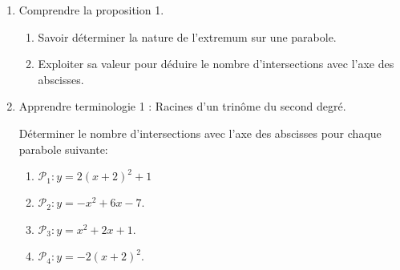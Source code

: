 \documentclass[a4paper,11pt]{article}
\theoremstyle{break}
\begin{document}
  \begin{Dev*}
    
    \begin{enumerate}
      
      \item Comprendre la proposition 1.
      \begin{enumerate}
	\item Savoir déterminer la nature de l'extremum sur une parabole.
	\item Exploiter sa valeur pour déduire le nombre d'intersections 
	avec l'axe des abscisses.
	
      \end{enumerate}
      \item Apprendre terminologie 1 : Racines d'un trinôme du second degré.
      \vspace{0.5cm}
      
      \begin{dm}
	
	Déterminer le nombre d'intersections avec l'axe des abscisses pour chaque parabole
	suivante:
	\begin{enumerate}
	  \item $\mathcal{P}_1:y=2(x+2)^2+1$
	  \item $\mathcal{P}_2:y=-x^2+6x-7$.%
	  \item $\mathcal{P}_3:y=x^2+2x+1$.
	  \item $\mathcal{P}_4:y=-2(x+2)^2$.
	\end{enumerate} 
      \end{dm}
      
      
      
    \end{enumerate}
  \end{Dev*}
  


  
\end{document}
